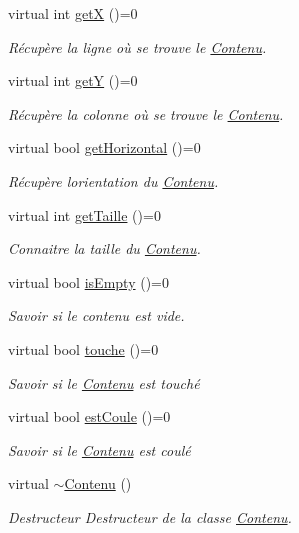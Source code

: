\begin{DoxyCompactItemize}
virtual int \hyperlink{class_contenu_afce83627ee635c60edb0edced8191af4}{getX} ()=0
\begin{DoxyCompactList}\small\item\em Récupère la ligne où se trouve le \hyperlink{class_contenu}{Contenu}. \end{DoxyCompactList}\item 
virtual int \hyperlink{class_contenu_a1087d1609ec4842bb3d2a5dd960359b6}{getY} ()=0
\begin{DoxyCompactList}\small\item\em Récupère la colonne où se trouve le \hyperlink{class_contenu}{Contenu}. \end{DoxyCompactList}\item 
virtual bool \hyperlink{class_contenu_aa9b4dbb3de416310cd53422a0d14879b}{get\+Horizontal} ()=0
\begin{DoxyCompactList}\small\item\em Récupère l\textquotesingle{}orientation du \hyperlink{class_contenu}{Contenu}. \end{DoxyCompactList}\item 
virtual int \hyperlink{class_contenu_abba99a1726eb744067cca7deb571444b}{get\+Taille} ()=0
\begin{DoxyCompactList}\small\item\em Connaitre la taille du \hyperlink{class_contenu}{Contenu}. \end{DoxyCompactList}\item 
virtual bool \hyperlink{class_contenu_a426053a6e632f1963c1c59c1515c99fb}{is\+Empty} ()=0
\begin{DoxyCompactList}\small\item\em Savoir si le contenu est vide. \end{DoxyCompactList}\item 
virtual bool \hyperlink{class_contenu_af917356550ccc6025373c652b6e8b938}{touche} ()=0
\begin{DoxyCompactList}\small\item\em Savoir si le \hyperlink{class_contenu}{Contenu} est touché \end{DoxyCompactList}\item 
virtual bool \hyperlink{class_contenu_ad8ba918a8d5a08e4f8c0c742778500d6}{est\+Coule} ()=0
\begin{DoxyCompactList}\small\item\em Savoir si le \hyperlink{class_contenu}{Contenu} est coulé \end{DoxyCompactList}\item 
virtual \hyperlink{class_contenu_a77f59e494b5c0f00ceb2da8d0067d4b8}{$\sim$\+Contenu} ()\hypertarget{class_contenu_a77f59e494b5c0f00ceb2da8d0067d4b8}{}\label{class_contenu_a77f59e494b5c0f00ceb2da8d0067d4b8}

\begin{DoxyCompactList}\small\item\em Destructeur Destructeur de la classe \hyperlink{class_contenu}{Contenu}. \end{DoxyCompactList}\end{DoxyCompactItemize}
